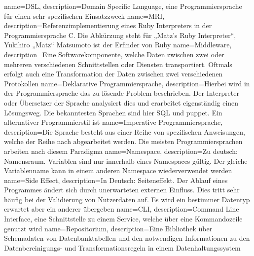 {
  name=DSL,
  description={Domain Specific Language, eine Programmiersprache für einen sehr
               spezifischen Einsatzzweck}
}
{
  name=MRI,
  description={Referenzimplementierung eines Ruby Interpreters in der
               Programmiersprache C. Die Abkürzung steht für „Matz's Ruby
               Interpreter“, Yukihiro „Matz“ Matsumoto ist der Erfinder von
               Ruby}
}
{
  name=Middleware,
  description={Eine Softwarekomponente, welche Daten zwischen zwei oder
               mehreren verschiedenen Schnittstellen oder Diensten
               transportiert. Oftmals erfolgt auch eine Transformation
               der Daten zwischen zwei verschiedenen Protokollen}
}
{
  name={Deklarative Programmiersprache},
  description={Hierbei wird in der Programmiersprache das zu lösende Problem
               beschrieben. Der Interpreter oder Übersetzer der Sprache
               analysiert dies und erarbeitet eigenständig einen Lösungsweg.
               Die bekanntesten Sprachen sind hier \gls{SQL} und puppet. Ein
               alternativer Programmierstil ist
               }
}
{
  name={Imperative Programmiersprache},
  description={Die Sprache besteht aus einer Reihe von spezifischen
               Anweisungen, welche der Reihe nach abgearbeitet werden. Die
               meisten Programmiersprachen arbeiten nach diesem Paradigma}
}
{
  name=Namespace,
  description={Zu deutsch: Namensraum. Variablen sind nur innerhalb eines
               Namespaces gültig. Der gleiche Variablenname kann in einem
               anderen Namespace wiederverwendet werden}
}
{
  name={Side Effect},
  description={In Deutsch: Seiteneffekt. Der Ablauf eines Programmes ändert
               sich durch unerwarteten externen Einfluss. Dies tritt sehr
               häufig bei der Validierung von Nutzerdaten auf. Es wird ein
               bestimmer Datentyp erwartet aber ein anderer übergeben}
}
{
  name=CLI,
  description={Command Line Interface, eine Schnittstelle zu einem Service,
               welche über eine Kommandozeile genutzt wird}
}
{
  name=Repositorium,
  description={Eine Bibliothek über Schemadaten von Datenbanktabellen und
               den notwendigen Informationen zu den Datenbereinigungs- und
               Transformationsregeln in einem Datenhaltungssystem}
}
